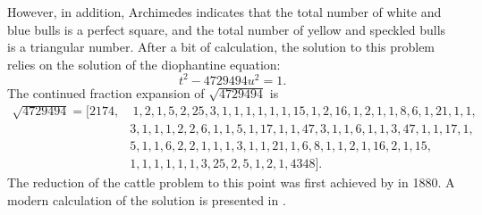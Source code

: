However, in addition, Archimedes indicates that the total number of
white and blue bulls is a perfect square, and the total number of
yellow and speckled bulls is a triangular number.  After a bit of
calculation, the solution to this problem relies on the solution of
the diophantine equation:
\[
t^2 - 4729494 u^2 = 1.
\]
The continued fraction expansion of $\sqrt{4729494}$ is
\[
\begin{aligned}
\sqrt{4729494} = 
[2174,&~1, 2, 1, 5, 2, 25, 3, 1, 1, 1, 1, 1, 1, 15, 1, 2, 16, 1, 2, 1,
1, 8, 6, 1, 21, 1, 1, \\
&3, 1, 1, 1, 2, 2, 6, 1, 1, 5, 1, 17, 1, 1, 47, 3, 1, 1, 6, 1, 1, 3,
  47, 1, 1, 17,1, \\ 
&5, 1, 1, 6, 2, 2, 1, 1, 1, 3, 1, 1, 21, 1, 6, 8, 1, 1, 2, 1, 16, 2,
  1, 15, \\
& 1, 1, 1, 1, 1, 1, 3, 25, 2, 5, 1, 2, 1, 4348]. 
\end{aligned}
\]
The reduction of the cattle problem to this point was first achieved
by {\Amthor} \cite{Amthor1880-vt} in 1880.  A modern calculation of the
solution is presented in \cite{Williams1965-qx}.

\normalsize

